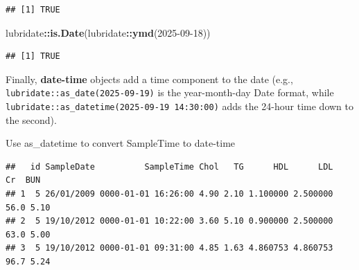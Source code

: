 \documentclass[
]{book}
\newenvironment{Shaded}{\begin{snugshade}}{\end{snugshade}}
\newcommand{\AttributeTok}[1]{\textcolor[rgb]{0.13,0.29,0.53}{#1}}
\newcommand{\DataTypeTok}[1]{\textcolor[rgb]{0.13,0.29,0.53}{#1}}
\newcommand{\DecValTok}[1]{\textcolor[rgb]{0.00,0.00,0.81}{#1}}
\newcommand{\FunctionTok}[1]{\textcolor[rgb]{0.13,0.29,0.53}{\textbf{#1}}}
\newcommand{\NormalTok}[1]{#1}
\newcommand{\OtherTok}[1]{\textcolor[rgb]{0.56,0.35,0.01}{#1}}
\newcommand{\SpecialCharTok}[1]{\textcolor[rgb]{0.81,0.36,0.00}{\textbf{#1}}}
\newcommand{\StringTok}[1]{\textcolor[rgb]{0.31,0.60,0.02}{#1}}
\begin{document}
\begin{verbatim}
## [1] TRUE
\end{verbatim}

\begin{Shaded}
\begin{Highlighting}[]
\NormalTok{lubridate}\SpecialCharTok{::}\FunctionTok{is.Date}\NormalTok{(lubridate}\SpecialCharTok{::}\FunctionTok{ymd}\NormalTok{(}\StringTok{\textquotesingle{}2025{-}09{-}18\textquotesingle{}}\NormalTok{))}
\end{Highlighting}
\end{Shaded}

\begin{verbatim}
## [1] TRUE
\end{verbatim}

Finally, \textbf{date-time} objects add a time component to the date (e.g., \texttt{lubridate::as\_date(\textquotesingle{}2025-09-19\textquotesingle{})} is the year-month-day Date format, while \texttt{lubridate::as\_datetime(\textquotesingle{}2025-09-19\ 14:30:00\textquotesingle{})} adds the 24-hour time down to the second).

Use as\_datetime to convert SampleTime to date-time

\begin{Shaded}
\end{Shaded}

\begin{verbatim}
##   id SampleDate          SampleTime Chol   TG      HDL      LDL   Cr  BUN
## 1  5 26/01/2009 0000-01-01 16:26:00 4.90 2.10 1.100000 2.500000 56.0 5.10
## 2  5 19/10/2012 0000-01-01 10:22:00 3.60 5.10 0.900000 2.500000 63.0 5.00
## 3  5 19/10/2012 0000-01-01 09:31:00 4.85 1.63 4.860753 4.860753 96.7 5.24
\end{verbatim}
\end{document}
